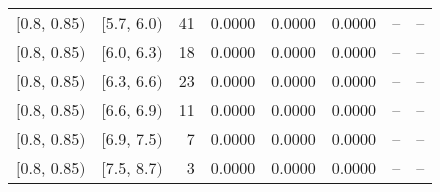 \begin{longtable}{| l | l | r | r | r | r | r | r |}
        $[$0.8, 0.85$)$ & $[$5.7, 6.0$)$ & 41 & 0.0000 & 0.0000 & 0.0000 & -- & -- \\
        $[$0.8, 0.85$)$ & $[$6.0, 6.3$)$ & 18 & 0.0000 & 0.0000 & 0.0000 & -- & -- \\
        $[$0.8, 0.85$)$ & $[$6.3, 6.6$)$ & 23 & 0.0000 & 0.0000 & 0.0000 & -- & -- \\
        $[$0.8, 0.85$)$ & $[$6.6, 6.9$)$ & 11 & 0.0000 & 0.0000 & 0.0000 & -- & -- \\
        $[$0.8, 0.85$)$ & $[$6.9, 7.5$)$ & 7 & 0.0000 & 0.0000 & 0.0000 & -- & -- \\
        $[$0.8, 0.85$)$ & $[$7.5, 8.7$)$ & 3 & 0.0000 & 0.0000 & 0.0000 & -- & -- \\
\end{longtable}
